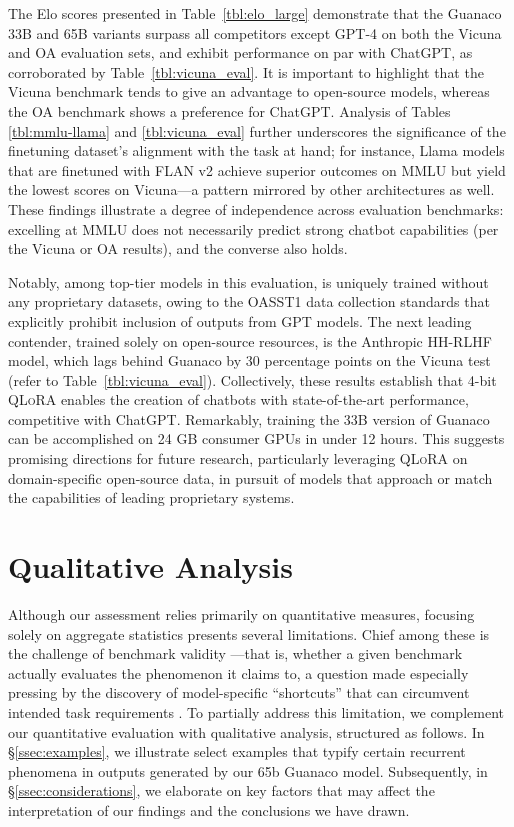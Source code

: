 The Elo scores presented in Table~\ref{tbl:elo_large} demonstrate that the {Guanaco} 33B and 65B variants surpass all competitors except GPT-4 on both the Vicuna and OA evaluation sets, and exhibit performance on par with ChatGPT, as corroborated by Table~\ref{tbl:vicuna_eval}. It is important to highlight that the Vicuna benchmark tends to give an advantage to open-source models, whereas the OA benchmark shows a preference for ChatGPT. Analysis of Tables \ref{tbl:mmlu-llama} and \ref{tbl:vicuna_eval} further underscores the significance of the finetuning dataset’s alignment with the task at hand; for instance, Llama models that are finetuned with FLAN v2 achieve superior outcomes on MMLU but yield the lowest scores on Vicuna—a pattern mirrored by other architectures as well. These findings illustrate a degree of independence across evaluation benchmarks: excelling at MMLU does not necessarily predict strong chatbot capabilities (per the Vicuna or OA results), and the converse also holds.

Notably, among top-tier models in this evaluation,  is uniquely trained without any proprietary datasets, owing to the OASST1 data collection standards that explicitly prohibit inclusion of outputs from GPT models. The next leading contender, trained solely on open-source resources, is the Anthropic HH-RLHF model, which lags behind {Guanaco} by 30 percentage points on the Vicuna test (refer to Table~\ref{tbl:vicuna_eval}). Collectively, these results establish that 4-bit \textsc{QLoRA} enables the creation of chatbots with state-of-the-art performance, competitive with ChatGPT. Remarkably, training the 33B version of {Guanaco} can be accomplished on 24 GB consumer GPUs in under 12 hours. This suggests promising directions for future research, particularly leveraging \textsc{QLoRA} on domain-specific open-source data, in pursuit of models that approach or match the capabilities of leading proprietary systems.

\section{Qualitative Analysis}

Although our assessment relies primarily on quantitative measures, focusing solely on aggregate statistics presents several limitations. Chief among these is the challenge of benchmark validity \citep{liao2021we}—that is, whether a given benchmark actually evaluates the phenomenon it claims to, a question made especially pressing by the discovery of model-specific ``shortcuts'' that can circumvent intended task requirements \citep{gururangan2018annotation, poliak2018hypothesis}. To partially address this limitation, we complement our quantitative evaluation with qualitative analysis, structured as follows. In \S\ref{ssec:examples}, we illustrate select examples that typify certain recurrent phenomena in outputs generated by our 65b {Guanaco} model. Subsequently, in \S\ref{ssec:considerations}, we elaborate on key factors that may affect the interpretation of our findings and the conclusions we have drawn.

